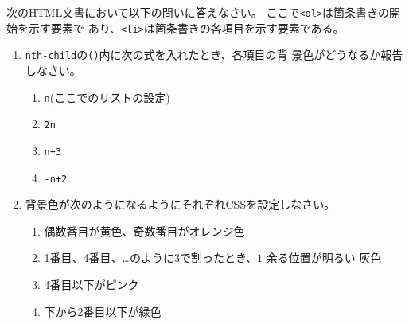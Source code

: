 \begin{Prob}\upshape\label{nth-child}
 次のHTML文書において以下の問いに答えなさい。
 ここで\texttt{<ol>}は箇条書きの開始を示す要素で
 あり、\texttt{<li>}は箇条書きの各項目を示す要素である。
\begin{enumerate}
\item \texttt{nth-child}の\texttt{()}内に次の式を入れたとき、各項目の背
      景色がどうなるか報告しなさい。
\begin{enumerate}
 \item \texttt{n}(ここでのリストの設定)
 \item \texttt{2n}
 \item \texttt{n+3}
 \item \texttt{-n+2}
\end{enumerate}
 \item 背景色が次のようになるようにそれぞれCSSを設定しなさい。
\begin{enumerate}
 \item 偶数番目が黄色、奇数番目がオレンジ色
 \item 1番目、4番目、\dots のように$3$で割ったとき、$1$ 余る位置が明るい
       灰色
 \item 4番目以下がピンク
 \item 下から2番目以下が緑色
\end{enumerate}
\end{enumerate}
\end{Prob}

